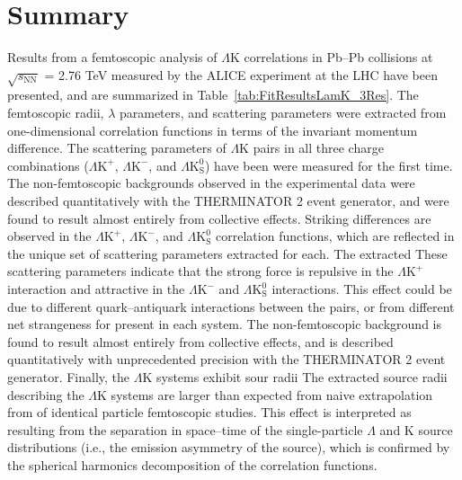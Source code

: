 \documentclass[ALICE,manyauthors]{cernphprep}
\newcommand{\ResultsDirBaseLamKch}{/home/jesse/Analysis/FemtoAnalysis/Results/Results_cLamcKch_20190319/}
\newcommand{\MomRes}{_MomResCrctn}%
\newcommand{\NonFlatBgdLamKch}{_NonFlatBgdCrctnLamK0LamKchPolynomial}
\newcommand{\ResNum}{_3Res}
\newcommand{\PrimMaxDecay}{_PrimMaxDecay10fm}
\newcommand{\ResMethod}{_UsingXiDataAndCoulombOnly}
\newcommand{\ParamFixAndShareLamKch}{_ShareLam_Dualie_ShareLam_ShareRadii}
\newcommand{\SaveNameModLamKch}{\MomRes\NonFlatBgdLamKch\ResNum\PrimMaxDecay\ResMethod\ParamFixAndShareLamKch}
\newcommand{\Lam}{$\Lambda$\xspace}
\newcommand{\LamK}{$\Lambda$K\xspace}
\newcommand{\LamKchP}{$\Lambda\mathrm{K^{+}}$\xspace}
\newcommand{\LamKchM}{$\Lambda\mathrm{K^{-}}$\xspace}
\newcommand{\LamKs}{$\Lambda\mathrm{K^{0}_{S}}$\xspace}
\begin{document}
\section{Summary}
\label{sec:Summary}



Results from a femtoscopic analysis of \LamK correlations in Pb--Pb collisions at $\sqrt{s_{\mathrm{NN}}}$ = 2.76 TeV measured by the ALICE experiment at the LHC have been presented, and are summarized in Table~\ref{tab:FitResultsLamK_3Res}.
The femtoscopic radii, $\lambda$ parameters, and scattering parameters were extracted from one-dimensional correlation functions in terms of the invariant momentum difference.
The scattering parameters of \LamK pairs in all three charge combinations (\LamKchP, \LamKchM, and \LamKs) {\color{red}have been} {\color{blue}were} measured for the first time.
{\color{blue}The non-femtoscopic backgrounds observed in the experimental data were described quantitatively with the THERMINATOR 2 event generator, and were found to result almost entirely from collective effects.}
Striking differences are observed in the \LamKchP, \LamKchM, and \LamKs correlation functions, which are reflected in the unique set of scattering parameters extracted for each.
{\color{red}The extracted} {\color{blue}These} scattering parameters indicate that the strong force is repulsive in the \LamKchP interaction and attractive in the \LamKchM and \LamKs interactions.
This effect could be due to different quark--antiquark interactions between the pairs, or from different net strangeness {\color{red}for} {\color{blue}present in} each system. 
{\color{red}The non-femtoscopic background is found to result almost entirely from collective effects, and is described quantitatively with unprecedented precision with the THERMINATOR 2 event generator.}
{\color{red}Finally, the \LamK systems exhibit sour radii} {\color{blue}The extracted source radii describing the \LamK systems are} larger than expected from {\color{blue}naive} extrapolation {\color{red}from} {\color{blue}of} identical particle femtoscopic studies.
This effect is interpreted as resulting from the separation in space--time of the single-particle \Lam and K source distributions (i.e., the emission asymmetry of the source){\color{blue}, which is confirmed by the spherical harmonics decomposition of the correlation functions}.
\end{document}
